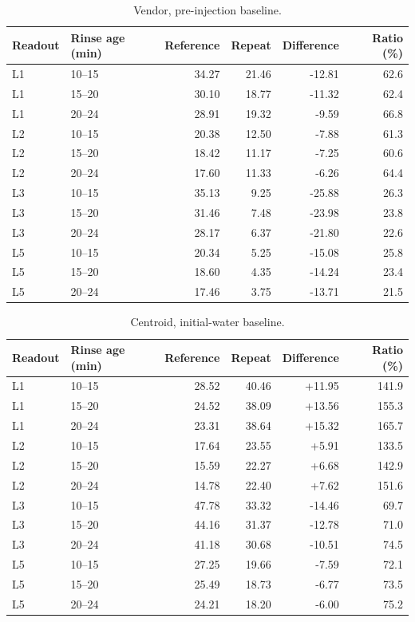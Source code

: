 \documentclass[lettersize,journal]{IEEEtran}
\begin{document}
\begin{table}[htbp]\centering\small
\caption{Vendor, pre-injection baseline.}
\begin{tabular}{llrrrr}\toprule
Readout & Rinse age (min) & Reference & Repeat & Difference & Ratio (\%)\\\midrule
L1 & 10--15 & 34.27 & 21.46 & -12.81 & 62.6\\
L1 & 15--20 & 30.10 & 18.77 & -11.32 & 62.4\\
L1 & 20--24 & 28.91 & 19.32 & -9.59 & 66.8\\
L2 & 10--15 & 20.38 & 12.50 & -7.88 & 61.3\\
L2 & 15--20 & 18.42 & 11.17 & -7.25 & 60.6\\
L2 & 20--24 & 17.60 & 11.33 & -6.26 & 64.4\\
L3 & 10--15 & 35.13 & 9.25 & -25.88 & 26.3\\
L3 & 15--20 & 31.46 & 7.48 & -23.98 & 23.8\\
L3 & 20--24 & 28.17 & 6.37 & -21.80 & 22.6\\
L5 & 10--15 & 20.34 & 5.25 & -15.08 & 25.8\\
L5 & 15--20 & 18.60 & 4.35 & -14.24 & 23.4\\
L5 & 20--24 & 17.46 & 3.75 & -13.71 & 21.5\\
\bottomrule\end{tabular}\end{table}

\begin{table}[htbp]\centering\small
\caption{Centroid, initial-water baseline.}
\begin{tabular}{llrrrr}\toprule
Readout & Rinse age (min) & Reference & Repeat & Difference & Ratio (\%)\\\midrule
L1 & 10--15 & 28.52 & 40.46 & +11.95 & 141.9\\
L1 & 15--20 & 24.52 & 38.09 & +13.56 & 155.3\\
L1 & 20--24 & 23.31 & 38.64 & +15.32 & 165.7\\
L2 & 10--15 & 17.64 & 23.55 & +5.91 & 133.5\\
L2 & 15--20 & 15.59 & 22.27 & +6.68 & 142.9\\
L2 & 20--24 & 14.78 & 22.40 & +7.62 & 151.6\\
L3 & 10--15 & 47.78 & 33.32 & -14.46 & 69.7\\
L3 & 15--20 & 44.16 & 31.37 & -12.78 & 71.0\\
L3 & 20--24 & 41.18 & 30.68 & -10.51 & 74.5\\
L5 & 10--15 & 27.25 & 19.66 & -7.59 & 72.1\\
L5 & 15--20 & 25.49 & 18.73 & -6.77 & 73.5\\
L5 & 20--24 & 24.21 & 18.20 & -6.00 & 75.2\\
\bottomrule\end{tabular}\end{table}
\end{document}

